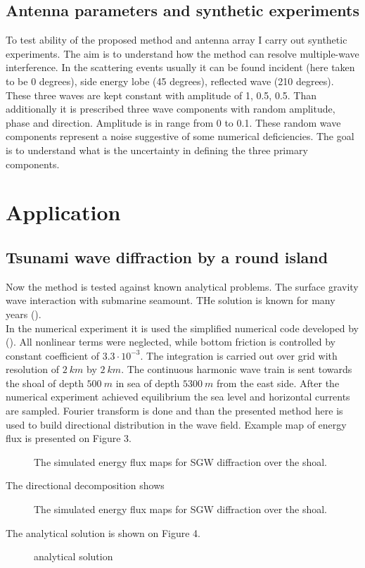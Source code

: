 \subsection{Antenna parameters and synthetic experiments}
To test ability of the proposed method and antenna array I carry out synthetic experiments. The aim is to understand how the method can resolve multiple-wave interference. In the scattering events usually it can be found incident (here taken to be 0 degrees), side energy lobe (45 degrees), reflected wave (210 degrees). These three waves are kept constant with amplitude of 1, 0.5, 0.5. Than additionally it is prescribed three wave components with random amplitude, phase and direction. Amplitude is in range from 0 to 0.1. These random wave components represent a noise suggestive of some numerical deficiencies. The goal is to understand what is the uncertainty in defining the three primary components.\\


\section{Application}
\subsection{Tsunami wave diffraction by a round island}
Now the method is tested against known analytical problems. The surface gravity wave interaction with submarine seamount. THe solution is known for many years (\cite{longuet1967trapping}).\\
In the numerical experiment it is used the simplified numerical code developed by (\cite{kowalik2005numerical}). All nonlinear terms were neglected, while bottom friction is controlled by constant coefficient of $3.3 \cdot 10^{-3}$. The integration is carried out over grid with resolution of $2~km$ by $2~km$. The continuous harmonic wave train is sent towards the shoal of depth $500~m$ in sea of depth $5300~m$ from the east side. After the numerical experiment achieved equilibrium the sea level and horizontal currents are sampled. Fourier transform is done and than the presented method here is used to build directional distribution in the wave field. Example map of energy flux is presented on Figure 3.\\
\begin{figure}
\caption{The simulated energy flux maps for SGW diffraction over the shoal.}
\end{figure}
The directional decomposition shows 
\begin{figure}
\caption{The simulated energy flux maps for SGW diffraction over the shoal.}
\end{figure}
The analytical solution is shown on Figure 4.
\begin{figure}
\caption{analytical solution}
\end{figure}

